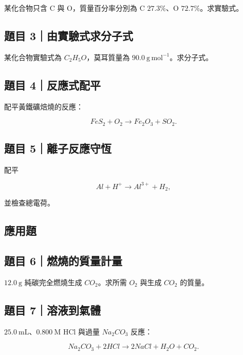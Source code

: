 \documentclass[11pt,a4paper]{article}
\begin{document}
某化合物只含 C 與 O，質量百分率分別為 C \(27.3\%\)、O \(72.7\%\)。求實驗式。

\subsection{題目 3｜由實驗式求分子式}\label{ux984cux76ee-3ux7531ux5be6ux9a57ux5f0fux6c42ux5206ux5b50ux5f0f}

某化合物實驗式為 \(C_2H_5O\)，莫耳質量為 \(90.0\ \mathrm{g\,mol^{-1}}\)。求分子式。

\subsection{題目 4｜反應式配平}\label{ux984cux76ee-4ux53cdux61c9ux5f0fux914dux5e73}

配平黃鐵礦焙燒的反應：

\[
FeS_2+O_2\rightarrow Fe_2O_3+SO_2.
\]

\subsection{題目 5｜離子反應守恆}\label{ux984cux76ee-5ux96e2ux5b50ux53cdux61c9ux5b88ux6046}

配平

\[
Al+H^+\rightarrow Al^{3+}+H_2,
\]

並檢查總電荷。

\subsection{應用題}\label{ux61c9ux7528ux984c}

\subsection{題目 6｜燃燒的質量計量}\label{ux984cux76ee-6ux71c3ux71d2ux7684ux8ceaux91cfux8a08ux91cf}

\(12.0\ \mathrm g\) 純碳完全燃燒生成 \(CO_2\)。求所需 \(O_2\) 與生成 \(CO_2\) 的質量。

\subsection{題目 7｜溶液到氣體}\label{ux984cux76ee-7ux6eb6ux6db2ux5230ux6c23ux9ad4}

\(25.0\ \mathrm{mL}\)、\(0.800\ \mathrm M\) HCl 與過量 \(Na_2CO_3\) 反應：

\[
Na_2CO_3+2HCl\rightarrow2NaCl+H_2O+CO_2.
\]
\end{document}
